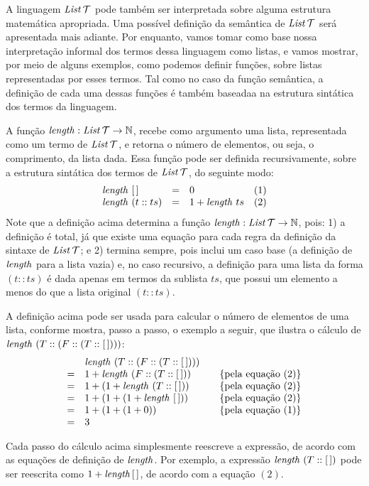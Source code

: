 A linguagem $\textit{List\/}\,\mathcal{T}$ pode também ser interpretada sobre alguma estrutura matemática apropriada. Uma possível definição da  semântica de $\textit{List\/}\,\mathcal{T}$ será  apresentada mais adiante. Por enquanto, vamos tomar como base nossa interpretação informal dos termos dessa linguagem como listas, e vamos mostrar, por meio de alguns exemplos, como podemos definir funções, sobre listas representadas por esses termos. Tal como no caso da função semântica, a definição de cada uma dessas funções é também baseadaa na estrutura sintática dos termos da linguagem.

\begin{Definition}
A função $\textit{length\/} : \textit{List\/}\,\mathcal{T} \rightarrow \mathbb{N}$, recebe como argumento uma lista, representada como um termo de $\textit{List\/}\,\mathcal{T}$, e retorna o número de elementos, ou seja, o comprimento, da lista dada. Essa função pode ser definida recursivamente, sobre a estrutura sintática dos termos de $\textit{List\/}\,\mathcal{T}$, do seguinte modo:
\[
\begin{array}{lclr}
  \textit{length\/}\,\,[\,] & = & 0 & (1)\\
  \textit{length\/}\,\,(t :: ts) & = & 1 + \textit{length\/}\,\, ts & (2)
\end{array}
\]
Note que a definição acima determina a função $\textit{length\/} : \textit{List\/}\,\mathcal{T} \rightarrow \mathbb{N}$, pois: 1) a definição \'e total, já que existe uma equação para cada regra da definição da sintaxe de $\textit{List\/}\,\mathcal{T}$; e 2) termina sempre, pois inclui um caso base (a definição de $\textit{length\/}$ para a lista vazia) e, no caso recursivo, a definição para uma lista da forma $(t :: ts)$ é dada apenas em termos da sublista $ts$, que possui um elemento a menos do que a lista original $(t::ts)$.
\end{Definition}

\begin{Example}
A definição acima pode ser usada para calcular o n\'umero de elementos de uma lista, conforme mostra, passo a passo, o exemplo a seguir, que ilustra o cálculo de $\textit{length\/}\,\,(T :: (F :: (T :: [\,])))$:
\[
\begin{array}{llcl}
& \length\,\,(T :: (F :: (T :: [\,]))) &  & \\
= &1 + \length\,\,(F :: (T :: [\,]))  & & \{\text{pela equa\c{c}\~ao }(2)\}\\
= &1 + (1 + \length\,\,(T :: [\,]))  &  & \{\text{pela equa\c{c}\~ao }(2)\}\\
= &1 + (1 + (1 + \length\,\,[\,]))  &  & \{\text{pela equa\c{c}\~ao }(2)\}\\
= &1 + (1 + (1 + 0))  &  & \{\text{pela equa\c{c}\~ao }(1)\}\\
= &3                  &   &
\end{array}
\]
\end{Example}
Cada passo do cálculo acima simplesmente reescreve a express\~ao, de acordo com as equa\c{c}\~oes de definição de $\textit{length\/}$. Por exemplo, a expressão $\textit{length\/}\,\,(T :: [\,])$  pode ser reescrita como $1 + \textit{length\/}\, [\,]$, de acordo com a equa\c{c}\~ao $(2)$.


